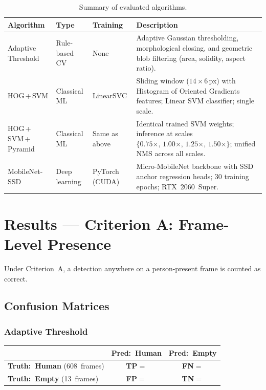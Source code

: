 \documentclass[11pt, a4paper]{article}
\newcommand{\confmat}[6]{%
    \def\cmTP{#1}\def\cmFN{#2}\def\cmFP{#3}\def\cmTN{#4}%
    \def\cmPos{#5}\def\cmNeg{#6}%
    \vspace{4pt}
    \begin{center}
    \renewcommand{\arraystretch}{1.8}%
    \begin{tabular}{lcc}
        \hline
        \rule{0pt}{2.4ex}%
        & \textbf{Pred:\ Human} & \textbf{Pred:\ Empty} \\[2pt]
        \hline
        \rule{0pt}{2.6ex}%
        \textbf{Truth:\ Human} (\cmPos\ frames)
            & \cellcolor{cellgreenlight}\textcolor{tpgreen}{\textbf{TP}}\;$=$\;\cmTP
            & \cellcolor{cellyellowlight}\textcolor{fnyellow}{\textbf{FN}}\;$=$\;\cmFN \\[4pt]
        \textbf{Truth:\ Empty} (\cmNeg\ frames)
            & \cellcolor{cellredlight}\textcolor{fpred}{\textbf{FP}}\;$=$\;\cmFP
            & \cellcolor{cellbluelight}\textcolor{tnblue}{\textbf{TN}}\;$=$\;\cmTN \\[2pt]
        \hline
    \end{tabular}
    \end{center}
    \vspace{4pt}
}
\begin{document}
\begin{table}[H]
\centering
\caption{Summary of evaluated algorithms.}
\renewcommand{\arraystretch}{1.3}
\begin{tabular}{>{\raggedright}p{2.9cm}
                >{\raggedright}p{2.4cm}
                >{\raggedright}p{2.0cm}
                >{\raggedright\arraybackslash}p{6.8cm}}
\toprule
\textbf{Algorithm} & \textbf{Type} & \textbf{Training} & \textbf{Description} \\
\midrule
Adaptive Threshold
    & Rule-based CV
    & None
    & Adaptive Gaussian thresholding, morphological closing, and geometric blob
      filtering (area, solidity, aspect ratio). \\[4pt]
HOG\,+\,SVM
    & Classical ML
    & LinearSVC
    & Sliding window ($14\!\times\!6$\,px) with Histogram of Oriented Gradients
      features; Linear SVM classifier; single scale. \\[4pt]
HOG\,+\,SVM\,+\,Pyramid
    & Classical ML
    & Same as above
    & Identical trained SVM weights; inference at scales
      $\{0.75\times,\,1.00\times,\,1.25\times,\,1.50\times\}$;
      unified NMS across all scales. \\[4pt]
MobileNet-SSD
    & Deep learning
    & PyTorch (CUDA)
    & Micro-MobileNet backbone with SSD anchor regression heads;
      30 training epochs; RTX~2060~Super. \\
\bottomrule
\end{tabular}
\label{tab:algorithms}
\end{table}

\section{Results — Criterion A: Frame-Level Presence}

Under Criterion~A, a detection anywhere on a person-present frame is counted as correct.

\subsection{Confusion Matrices}

\subsubsection*{Adaptive Threshold}
\confmat{591}{17}{1}{12}{608}{13}
\end{document}
